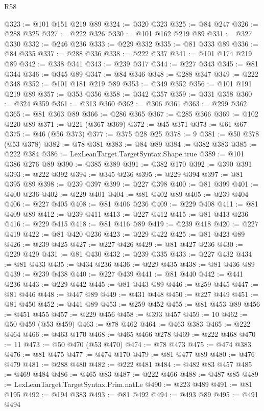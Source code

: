 \begin{lexlean}{R58}
\begin{coremodule}
@323 := @101 @151 @219 @89
@324 := @320 @323
@325 := @84 @247
@326 := @288 @325
@327 := @222 @326
@330 := @101 @162 @219 @89
@331 := @327 @330
@332 := @246 @236
@333 := @229 @332
@335 := @81 @333 @89
@336 := @84 @335
@337 := @288 @336
@338 := @222 @337
@341 := @101 @174 @219 @89
@342 := @338 @341
@343 := @239 @317
@344 := @227 @343
@345 := @81 @344
@346 := @345 @89
@347 := @84 @346
@348 := @288 @347
@349 := @222 @348
@352 := @101 @181 @219 @89
@353 := @349 @352
@356 := @101 @191 @219 @89
@357 := @353 @356
@358 := @342 @357
@359 := @331 @358
@360 := @324 @359
@361 := @313 @360
@362 := @306 @361
@363 := @299 @362
@365 := @81 @363 @89
@366 := @286 @365
@367 := @285 @366
@369 := @102 @220 @89
@371 := @221 (@367 @369)
@372 := @45 @371
@373 := @61 @67
@375 := @46 (@56 @373)
@377 := @375 @28 @25
@378 := 9
@381 := @50 @378 (@53 @378)
@382 := @78 @381
@383 := @84 @89
@384 := @382 @383
@385 := @222 @384
@386 := LexLeanTarget.TargetSyntax.Shape.true
@389 := @101 @386 @276 @89
@390 := @385 @389
@391 := @382 @170
@392 := @390 @391
@393 := @222 @392
@394 := @345 @236
@395 := @229 @394
@397 := @81 @395 @89
@398 := @239 @397
@399 := @227 @398
@400 := @81 @399
@401 := @400 @236
@402 := @229 @401
@404 := @81 @402 @89
@405 := @239 @404
@406 := @227 @405
@408 := @81 @406 @236
@409 := @229 @408
@411 := @81 @409 @89
@412 := @239 @411
@413 := @227 @412
@415 := @81 @413 @236
@416 := @229 @415
@418 := @81 @416 @89
@419 := @239 @418
@420 := @227 @419
@422 := @81 @420 @236
@423 := @229 @422
@425 := @81 @423 @89
@426 := @239 @425
@427 := @227 @426
@429 := @81 @427 @236
@430 := @229 @429
@431 := @81 @430
@432 := @239 @335
@433 := @227 @432
@434 := @81 @433
@435 := @434 @236
@436 := @229 @435
@438 := @81 @436 @89
@439 := @239 @438
@440 := @227 @439
@441 := @81 @440
@442 := @441 @236
@443 := @229 @442
@445 := @81 @443 @89
@446 := @259 @445
@447 := @81 @446
@448 := @447 @89
@449 := @431 @448
@450 := @227 @449
@451 := @81 @450
@452 := @441 @89
@453 := @259 @452
@455 := @81 @453 @89
@456 := @451 @455
@457 := @229 @456
@458 := @393 @457
@459 := 10
@462 := @50 @459 (@53 @459)
@463 := @78 @462
@464 := @463 @383
@465 := @222 @464
@466 := @463 @170
@468 := @465 @466 @278
@469 := @222 @468
@470 := 11
@473 := @50 @470 (@53 @470)
@474 := @78 @473
@475 := @474 @383
@476 := @81 @475
@477 := @474 @170
@479 := @81 @477 @89
@480 := @476 @479
@481 := @288 @480
@482 := @222 @481
@484 := @482 @83 @457
@485 := @469 @484
@486 := @465 @83
@487 := @222 @466
@488 := @487 @85
@489 := LexLeanTarget.TargetSyntax.Prim.natLe
@490 := @223 @489
@491 := @81 @195
@492 := @194 @383
@493 := @81 @492
@494 := @493 @89
@495 := @491 @494

\end{coremodule}
\end{lexlean}
